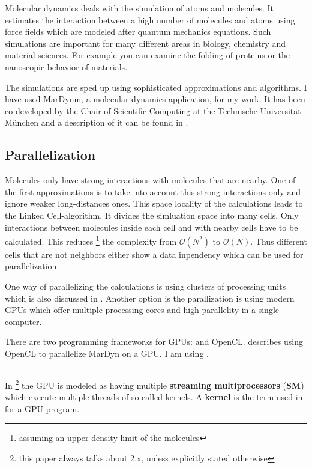 Molecular dynamics deals with the simulation of atoms and molecules. It estimates the interaction between a high number of molecules and atoms using force fields which are modeled after quantum mechanics equations. 
Such simulations are important for many different areas in biology, chemistry and material sciences. For example you can examine the folding of proteins or the nanoscopic behavior of materials.

The simulations are sped up using sophisticated approximations and algorithms. I have used MarDynm, a molecular dynamics application, for my work. It has been co-developed by the Chair of Scientific Computing at the Technische Universit\"at M\"unchen and a description of it can be found in \TODO{}.

\subsection{Parallelization}
Molecules only have strong interactions with molecules that are nearby. One of the first approximations is to take into account this strong interactions only and ignore weaker long-distances ones.
This space locality of the calculations leads to the Linked Cell-algorithm. It divides the simluation space into many cells. Only interactions between molecules inside each cell and with nearby cells have to be calculated. This reduces \footnote{assuming an upper density limit of the molecules}  
 the complexity from $ \mathcal{O} \left( N^2 \right) $ to $ \mathcal{O} \left( N \right) $.
Thus different cells that are not neighbors either show a data inpendency which can be used for parallelization.

One way of parallelizing the calculations is using clusters of processing units which is also discussed in \TODO{}. Another option is the parallization is using modern GPUs which offer multiple processing cores and high parallelity in a single computer.

There are two programming frameworks for GPUs: \cuda{} and OpenCL. 
 describes using OpenCL to parallelize MarDyn on a GPU. I am using \cuda{}.

\subsection{\cuda{}}
In \cuda{}\footnote{this paper always talks about \cuda{} 2.x, unless explicitly stated otherwise} the GPU is modeled as having multiple \textbf{streaming multiprocessors} (\textbf{SM}) which execute multiple threads of so-called kernels. A \textbf{kernel} is the term used in \cuda{} for a GPU program.

